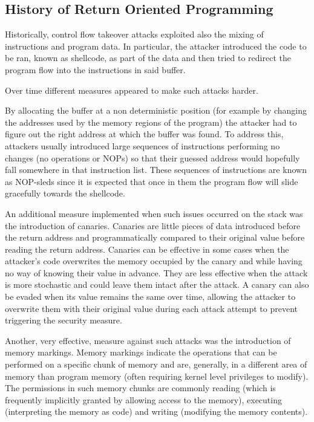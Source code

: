 \documentclass{article}
\begin{document}
\subsection{History of Return Oriented Programming}
Historically, control flow takeover attacks exploited also the mixing of instructions and program data. In particular, the attacker introduced the code to be ran, known as shellcode, as part of the data and then tried to redirect the program flow into the instructions in said buffer.

Over time different measures appeared to make such attacks harder.

By allocating the buffer at a non deterministic position (for example by changing the addresses used by the memory regions of the program) the attacker had to figure out the right address at which the buffer was found. To address this, attackers usually introduced large sequences of instructions performing no changes (no operations or NOPs) so that their guessed address would hopefully fall somewhere in that instruction list. These sequences of instructions are known as NOP-sleds since it is expected that once in them the program flow will slide gracefully towards the shellcode.

An additional measure implemented when such issues occurred on the stack was the introduction of canaries. Canaries are little pieces of data introduced before the return address and programmatically compared to their original value before reading the return address.  Canaries can be effective in some cases when the attacker's code overwrites the memory occupied by the canary and while having no way of knowing their value in advance. They are less effective when the attack is more stochastic and could leave them intact after the attack. A canary can also be evaded when its value remains the same over time, allowing the attacker to overwrite them with their original value during each attack attempt to prevent triggering the security measure. 

Another, very effective, measure against such attacks was the introduction of memory markings. Memory markings indicate the operations that can be performed on a specific chunk of memory and are, generally, in a different area of memory than program memory (often requiring kernel level privileges to modify). The permissions in such memory chunks are commonly reading (which is frequently implicitly granted by allowing access to the memory), executing (interpreting the memory as code) and writing (modifying the memory contents).
\end{document}
